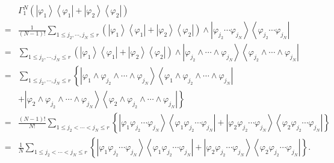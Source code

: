 \documentclass[12pt]{article}
\begin{document}
\begin{eqnarray*}
&&\Gamma _{1}^{N}\left( \left\vert \varphi _{1}\right\rangle \left\langle
\varphi _{1}\right\vert +\left\vert \varphi _{2}\right\rangle \left\langle
\varphi _{2}\right\vert \right) \\
&=&\frac{1}{\left( N-1\right) !}\sum_{1\leq j_{2},\cdots ,j_{N}\leq r}\left(
\left\vert \varphi _{1}\right\rangle \left\langle \varphi _{1}\right\vert
+\left\vert \varphi _{2}\right\rangle \left\langle \varphi _{2}\right\vert
\right) \wedge \left\vert \varphi _{j_{2}}\cdots \varphi
_{j_{N}}\right\rangle \left\langle \varphi _{j_{2}}\cdots \varphi
_{j_{N}}\right\vert \\
&=&\sum_{1\leq j_{2},\cdots ,j_{N}\leq r}\left( \left\vert \varphi
_{1}\right\rangle \left\langle \varphi _{1}\right\vert +\left\vert \varphi
_{2}\right\rangle \left\langle \varphi _{2}\right\vert \right) \wedge
\left\vert \varphi _{j_{2}}\wedge \cdots \wedge \varphi
_{j_{N}}\right\rangle \left\langle \varphi _{j_{2}}\wedge \cdots \wedge
\varphi _{j_{N}}\right\vert \\
&=&\sum_{1\leq j_{2},\cdots ,j_{N}\leq r}\left\{ \left\vert \varphi
_{1}\wedge \varphi _{j_{2}}\wedge \cdots \wedge \varphi
_{j_{N}}\right\rangle \left\langle \varphi _{1}\wedge \varphi _{j_{2}}\wedge
\cdots \wedge \varphi _{j_{N}}\right\vert \right. \\
&&\left. +\left\vert \varphi _{2}\wedge \varphi _{j_{2}}\wedge \cdots \wedge
\varphi _{j_{N}}\right\rangle \left\langle \varphi _{2}\wedge \varphi
_{j_{2}}\wedge \cdots \wedge \varphi _{j_{N}}\right\vert \right\} \\
&=&\frac{\left( N-1\right) !}{N!}\sum_{1\leq j_{2}<\cdots <j_{N}\leq
r}\left\{ \left\vert \varphi _{1}\varphi _{j_{2}}\cdots \varphi
_{j_{N}}\right\rangle \left\langle \varphi _{1}\varphi _{j_{2}}\cdots
\varphi _{j_{N}}\right\vert +\left\vert \varphi _{2}\varphi _{j_{2}}\cdots
\varphi _{j_{N}}\right\rangle \left\langle \varphi _{2}\varphi
_{j_{2}}\cdots \varphi _{j_{N}}\right\vert \right\} \\
&=&\frac{1}{N}\sum_{1\leq j_{2}<\cdots <j_{N}\leq r}\left\{ \left\vert
\varphi _{1}\varphi _{j_{2}}\cdots \varphi _{j_{N}}\right\rangle
\left\langle \varphi _{1}\varphi _{j_{2}}\cdots \varphi _{j_{N}}\right\vert
+\left\vert \varphi _{2}\varphi _{j_{2}}\cdots \varphi _{j_{N}}\right\rangle
\left\langle \varphi _{2}\varphi _{j_{2}}\cdots \varphi _{j_{N}}\right\vert
\right\} .
\end{eqnarray*}
\end{document}
